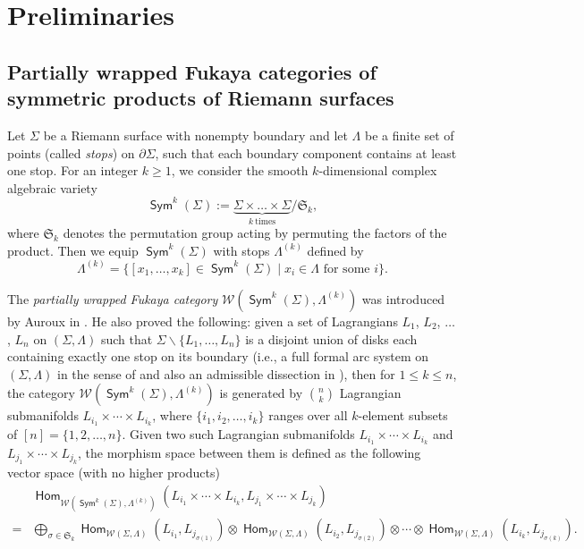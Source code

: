 \documentclass[a4paper, reqno, 11pt]{amsart}
\theoremstyle{definition}
\newcommand{\opname}[1]{\operatorname{\mathsf{#1}}}
\newcommand{\Hom}{\opname{Hom}}
\newcommand{\Sym}{\opname{Sym}}
\begin{document}
	
	
	
	
	\section{Preliminaries}
	\subsection{Partially wrapped Fukaya categories of symmetric products of Riemann surfaces}
	Let $\Sigma$ be a Riemann surface with nonempty boundary and let $\Lambda$ be a finite set of points (called {\it stops}) on $\partial \Sigma$, such that each boundary component contains at least one stop. For an integer $k\geq 1$, we consider the smooth $k$-dimensional complex algebraic variety
	$$\Sym^k (\Sigma):= \underbrace{\Sigma \times \dots \times \Sigma}_{k\ \text{times}}/\mathfrak{S}_k ,$$ 
	where $\mathfrak{S}_k$ denotes the permutation group acting by permuting the factors of the product. Then we equip $\Sym^k (\Sigma)$ with stops $\Lambda^{(k)}$ defined by
	\[
	\Lambda^{(k)} = \{ [x_1, \dots, x_k] \in \Sym^k(\Sigma) \mid x_i \in \Lambda \text{ for some } i \}.
	\]
	
	The \textit{partially wrapped Fukaya category} $\mathcal{W}(\Sym^k(\Sigma), \Lambda^{(k)})$ was introduced by Auroux in \cite{Auroux2010a, Auroux2010b}. He also proved the following: given a set of Lagrangians $L_1$, $L_2$, $\dots$, $L_n$ on $(\Sigma, \Lambda)$ such that $\Sigma \backslash \{L_1, \dots, L_n\}$ is a disjoint union of disks each containing exactly one stop on its boundary (i.e., a full formal arc system on $(\Sigma, \Lambda)$ in the sense of \cite{Haiden-Katzarkov-Kontsevich2017} and also an admissible dissection in \cite{Amiot-Plamondon-Schroll2023}), then for $1\leq k \leq n$, the category $\mathcal{W}(\Sym^k(\Sigma), \Lambda^{(k)})$ is generated by $\binom{n}{k}$ Lagrangian submanifolds $L_{i_1}\times \cdots \times L_{i_k}$, where $\{i_1, i_2,\dots, i_k\}$ ranges over all $k$-element subsets of $[n] = \{1, 2, \dots, n\}.$ Given two such Lagrangian submanifolds $L_{i_1}\times \cdots \times L_{i_k}$ and $L_{j_1}\times \cdots \times L_{j_k}$, the morphism space  between them is defined as the following vector space (with no higher products)
	\begin{align*}
		&\Hom_{\mathcal{W}(\Sym^k(\Sigma), \Lambda^{(k)})}(L_{i_1}\times \cdots \times L_{i_k},L_{j_1}\times \cdots \times L_{j_k})\\
		=&\bigoplus_{\sigma \in \mathfrak{S}_k} \Hom_{\mathcal{W}(\Sigma, \Lambda)}(L_{i_1},L_{j_{\sigma(1)}})\otimes \Hom_{\mathcal{W}(\Sigma, \Lambda)}(L_{i_2},L_{j_{\sigma(2)}})\otimes \cdots \otimes \Hom_{\mathcal{W}(\Sigma, \Lambda)}(L_{i_k},L_{j_{\sigma(k)}}).
	\end{align*}
	
\end{document}
